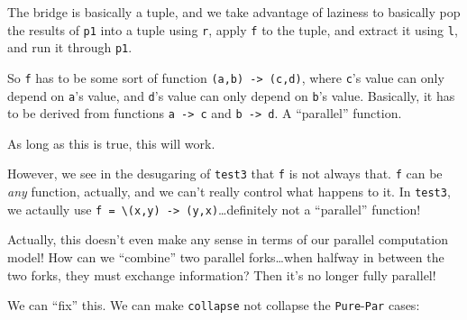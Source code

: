 \documentclass[]{article}
\begin{document}
The bridge is basically a tuple, and we take advantage of laziness to basically
pop the results of \texttt{p1} into a tuple using \texttt{r}, apply \texttt{f}
to the tuple, and extract it using \texttt{l}, and run it through
\texttt{p1\textquotesingle{}}.

So \texttt{f} has to be some sort of function
\texttt{(a,b)\ -\textgreater{}\ (c,d)}, where \texttt{c}'s value can only depend
on \texttt{a}'s value, and \texttt{d}'s value can only depend on \texttt{b}'s
value. Basically, it has to be derived from functions
\texttt{a\ -\textgreater{}\ c} and \texttt{b\ -\textgreater{}\ d}. A
``parallel'' function.

As long as this is true, this will work.

However, we see in the desugaring of \texttt{test3} that \texttt{f} is not
always that. \texttt{f} can be \emph{any} function, actually, and we can't
really control what happens to it. In \texttt{test3}, we actaully use
\texttt{f\ =\ \textbackslash{}(x,y)\ -\textgreater{}\ (y,x)}\ldots{}definitely
not a ``parallel'' function!

Actually, this doesn't even make any sense in terms of our parallel computation
model! How can we ``combine'' two parallel forks\ldots{}when halfway in between
the two forks, they must exchange information? Then it's no longer fully
parallel!

We can ``fix'' this. We can make \texttt{collapse} not collapse the
\texttt{Pure}-\texttt{Par} cases:
\end{document}
